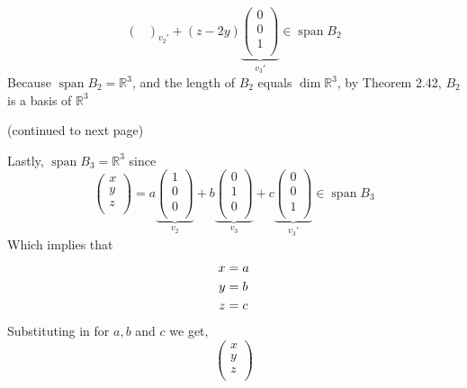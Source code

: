 \documentclass[12pt]{article}
\newcommand{\R}{\mathbb{R}}
\begin{document}
\begin{enumerate}
$${\begin{pmatrix}
        \end{pmatrix}
    }_{v_2'}
    + (z-2y)
    \underbrace{
        \begin{pmatrix}
            0 \\ 0 \\ 1 \\ 
        \end{pmatrix}
    }_{v_3'} \in \operatorname{span}B_2$$
    Because $\operatorname{span}B_2 = \R^3$, and the length of $B_2$ equals $\operatorname{dim}\R^3$, by Theorem 2.42, $B_2$ is a basis of $\R^3$
    \vspace{1in}\\\begin{center}
        (continued to next page)
    \end{center}
    \newpage
    Lastly, $\operatorname{span}B_3 = \R^3$ since
    $$\begin{pmatrix}
            x \\ y \\ z \\ 
        \end{pmatrix} = a \underbrace{
        \begin{pmatrix}
            1 \\ 0 \\ 0 \\ 
        \end{pmatrix}
    }_{v_2}
    + b
    \underbrace{
        \begin{pmatrix}
            0 \\ 1 \\ 0 \\ 
        \end{pmatrix}
    }_{v_3}
    + c
    \underbrace{
        \begin{pmatrix}
            0 \\ 0 \\ 1 \\ 
        \end{pmatrix}
    }_{v_3'} 
    \in \operatorname{span}B_3
    $$
    Which implies that \begin{align}x &= a\notag\\ y &= b \notag\\ z &= c\notag\end{align}
    Substituting in for $a,b$ and $c$ we get,
    $$\begin{pmatrix}
            x \\ y \\ z \\ 

\end{pmatrix}$$
\end{enumerate}
\end{document}
